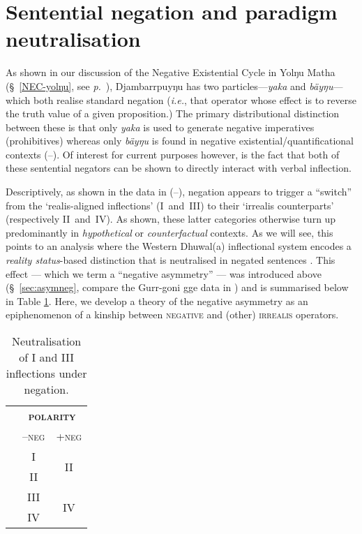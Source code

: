 \section{Sentential negation and paradigm neutralisation}\label{sec:negs}

As shown in our discussion of the Negative Existential Cycle in Yolŋu Matha (\S~\ref{NEC-yolŋu}, see \textit{p.}~\pageref{sec:nec-djr}), Djambarrpuyŋu has two particles---\textit{yaka} and \textit{bäyŋu}---which both realise standard negation (\textit{i.e.}, that operator whose effect is to reverse the truth value of a given proposition.) The primary distributional distinction between these is that only \textit{yaka} is used to generate negative imperatives (prohibitives) whereas only \textit{bäyŋu} is found in negative existential/quantificational contexts (--). Of interest for current purposes however, is the fact that both of these sentential negators can be shown to directly interact with verbal inflection.


Descriptively, as shown in the data in (--), negation appears to trigger a ``switch'' from the `realis-aligned inflections' (\gls{I}~and~\gls{III}) to their `irrealis counterparts' (respectively \gls{II}~and~\gls{IV}). As shown, these latter categories otherwise turn up predominantly in \textit{hypothetical} or \textit{counterfactual} contexts. As we will see, this points to an analysis where the Western Dhuwal(a) inflectional system encodes a \textit{reality status}-based distinction that is neutralised in negated sentences \citep[see also discussion in][356]{Wilkinson1991}. This effect --- which we term a ``negative asymmetry'' \citep[specifically \textsc{\texttt{a/nonreal}}, following][]{Miestamo2005} --- was introduced above (\S~\ref{sec:asymneg}, compare the Gurr-goni \gls{gge} data in )  and is summarised below in Table \ref{tab:negneut}. Here, we develop a theory of the negative asymmetry as an epiphenomenon of a kinship between \textsc{negative} and (other) \textsc{irrealis} operators.

\begin{table}[h]\centering
	\begin{tabular}{ccc}
		&\multicolumn{2}{c}{\textsc{\textbf{polarity}}} \\
		& \textsc{--neg} & \textsc{+neg}\\\midrule
		&	\gls{I} & \multirow{2}{*}{\gls{II}}\\
		& \gls{II} \\\midrule
		&	\gls{III} & \multirow{2}{*}{\gls{IV}}\\
		& \gls{IV} \\\bottomrule
	\end{tabular}
	\caption{Neutralisation of \gls{I} and \gls{III} inflections under negation.}\label{tab:negneut}
\end{table}



